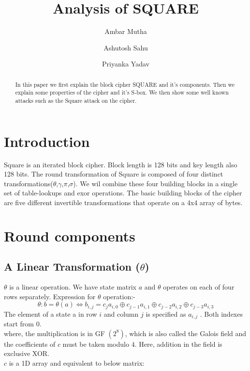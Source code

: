 \documentclass[preprint]{transcrypto}
\author{Ambar Mutha \and Ashutosh Sahu \and Priyanka Yadav}
\institute{
  IIT Bhilai, Raipur, India, \email[ambarm@iitbhilai.ac.in,ashutoshsahu@iitbhilai.ac.in,priyankay@iitbhilai.ac.in]{{ambarm,ashutoshsahu,priyankay}@iitbhilai.ac.in}
}
\title{Analysis of SQUARE}
\begin{document}
\maketitle




\begin{abstract}
  In this paper we first explain the block cipher SQUARE and it's components. Then we explain some properties of the cipher and it's S-box. We then show some well known attacks such as the Square attack on the cipher.
\end{abstract}



\section{Introduction}

Square is an iterated block cipher. Block length is 128 bits and key length also 128 bits. The round transformation of Square is composed of four distinct transformations($\theta$,$\gamma$,$\pi$,$\sigma$). We wil combine these four building blocks in a single set of table-lookups and exor operations. The basic building blocks of the cipher are five different invertible transformations that operate on a 4x4 array of bytes.

\section{Round components}
\subsection{A Linear Transformation ($\theta$)}
$\theta$ is a linear operation. We have state matrix $a$ and $\theta$ operates on each of four rows separately. Expression for $\theta$ operation:-
$$
  \theta: b=\theta(a) \Leftrightarrow b_{i, j}=c_{j} a_{i, 0} \oplus c_{j-1} a_{i, 1} \oplus c_{j-2} a_{i, 2} \oplus c_{j-3} a_{i, 3}
$$
The element of a state a in row $i$ and column $j$ is specified as $a_{i, j}$ . Both indexes start from $0$.\\
where, the multiplication is in GF $\left(2^{8}\right)$, which is also called the Galois field and the coefficients of $c$ must be taken modulo $4 .$ Here, addition in the field is exclusive XOR.\\
$c$ is a 1D array and equivalent to below matrix:
\end{document}
